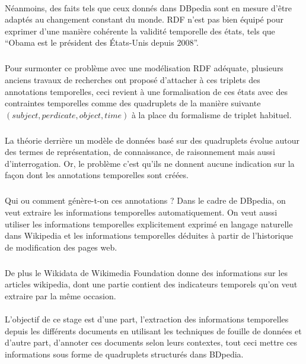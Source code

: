 \paragraph{}
Néanmoins, des faits tels que ceux donnés dans DBpedia sont en mesure d’être adaptés au changement constant du monde.
RDF n’est pas bien équipé pour exprimer d’une manière cohérente la validité temporelle des états, tels que “Obama est le président des États-Unis depuis 2008”. 
\subparagraph{}
Pour surmonter ce problème avec une modélisation RDF adéquate, plusieurs anciens travaux de recherches ont proposé d’attacher à ces triplets des annotations temporelles, ceci revient à une formalisation de ces états avec des contraintes temporelles comme des quadruplets de la manière suivante $(subject, perdicate, object, time)$ à la place du formalisme de triplet habituel.
\subparagraph{}
La théorie derrière un modèle de données basé sur des quadruplets évolue autour des termes de représentation, de connaissance, de raisonnement mais aussi d’interrogation. Or, le problème c’est qu’ils ne donnent aucune indication sur la façon dont les annotations temporelles sont créées.
\subparagraph{}
Qui ou comment génère-t-on ces annotations ?
\newline
Dans le cadre de DBpedia, on veut extraire les informations temporelles automatiquement. On veut aussi utiliser les informations temporelles explicitement exprimé en langage naturelle dans Wikipedia et les informations temporelles déduites à partir de l’historique de modification des pages web.
\subparagraph{}
De plus le Wikidata de Wikimedia Foundation donne des informations sur les articles wikipedia, dont une partie contient des indicateurs temporels qu’on veut extraire par la même occasion.
\paragraph{}
L’objectif de ce stage est d’une part, l’extraction des informations temporelles depuis les différents documents en utilisant les techniques de fouille de données et d’autre part, d’annoter ces documents selon leurs contextes, tout ceci mettre ces informations sous forme de quadruplets structurés dans BDpedia.
